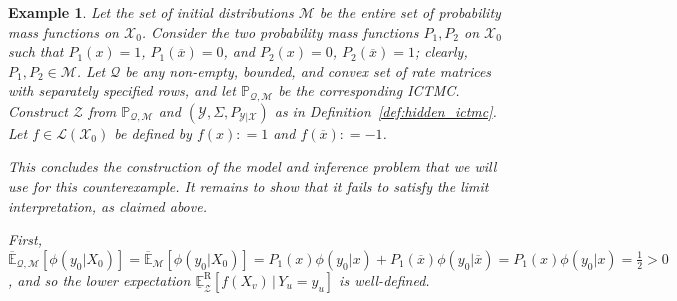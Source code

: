 \documentclass[3p]{elsarticle}
\newtheorem{example}{Example}[section]
\newcommand{\states}{\mathcal{X}}
\newcommand{\observs}{\mathcal{Y}}
\newcommand{\uexp}{\overline{\mathbb{E}}_{\rateset,\mathcal{M}}}
\newcommand{\gambles}{\mathcal{L}}
\newcommand{\rateset}{\mathcal{Q}}
\newcommand{\coloneqq}{:\!=}
\begin{document}
\begin{example}
Let the set of initial distributions $\mathcal{M}$ be the entire set of probability mass functions on $\states_0$. Consider the two probability mass functions $P_1,P_2$ on $\states_0$ such that $P_1(x)=1$, $P_1(\overline{x})=0$, and $P_2(x)=0$, $P_2(\overline{x})=1$; clearly, $P_1,P_2\in\mathcal{M}$. Let $\rateset$ be any non-empty, bounded, and convex set of rate matrices with separately specified rows, and let $\mathbb{P}_{\rateset,\mathcal{M}}$ be the corresponding ICTMC. Construct $\mathcal{Z}$ from $\mathbb{P}_{\rateset,\mathcal{M}}$ and $(\observs,\Sigma,P_{\observs\vert\states})$ as in Definition~\ref{def:hidden_ictmc}. Let $f\in\gambles(\states_0)$ be defined by $f(x)\coloneqq 1$ and $f(\overline{x})\coloneqq -1$. 

This concludes the construction of the model and inference problem that we will use for this counterexample. It remains to show that it fails to satisfy the limit interpretation, as claimed above.

First, $\uexp[\phi(y_0\vert X_0)]=\overline{\mathbb{E}}_\mathcal{M}[\phi(y_0\vert X_0)] = P_1(x)\phi(y_0\vert x) + P_1(\overline{x})\phi(y_0\vert \overline{x})=P_1(x)\phi(y_0\vert x) = \frac{1}{2}>0$, and so the lower expectation $\underline{\mathbb{E}}_\mathcal{Z}^\mathrm{R}[f(X_v)\,\vert\, Y_u=y_u]$ is well-defined.


\end{example}
\end{document}
